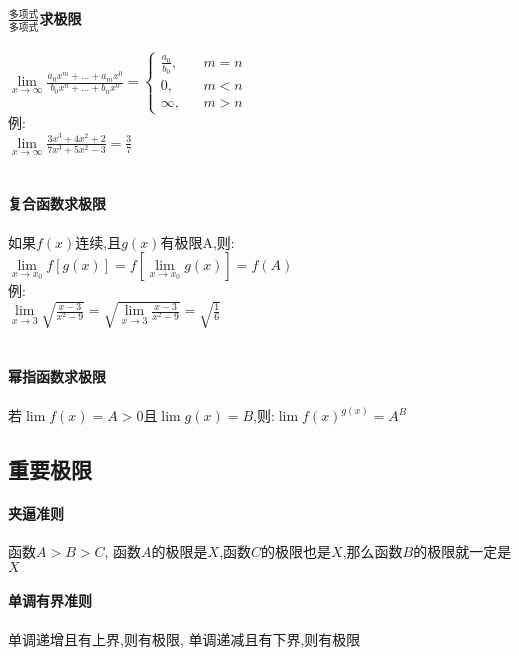 \documentclass{article}
\begin{document}
\begin{flushleft}
	\paragraph{$\frac{\mbox{多项式}}{\mbox{多项式}}$求极限}
	$\lim\limits_{x\to \infty} \frac{a_0x^m+...+a_mx^0}{b_0x^n+...+b_nx^0}=
	\left\{
	\begin{array}{rcl}
	\frac{a_0}{b_0}, & & {m=n}\\
	0, & & {m<n}\\
	\infty, & & {m>n}
	\end{array} \right.$\\
	例:\\
	$\lim\limits_{x\to \infty} \frac{3x^3+4x^2+2}{7x^3+5x^2-3} = \frac{3}{7}$\\
	~\\
	\paragraph{复合函数求极限}
	如果$f(x)$连续,且$g(x)$有极限A,则:\\
	$\lim\limits_{x\to x_0} f[g(x)]=f[\lim\limits_{x\to x_0}g(x)]=f(A)$\\
	例:\\
	$\lim\limits_{x\to 3} \sqrt{\frac{x-3}{x^2-9}}= \sqrt{\lim\limits_{x\to 3} \frac{x-3}{x^2-9}}=\sqrt{\frac{1}{6}}$\\
	~\\
	\paragraph{幂指函数求极限}
	若$\lim f(x)=A>0$且$\lim g(x)=B$,则:$\lim f(x)^{g(x)}=A^B$\\
	
	\subsection{重要极限}
	
	\paragraph{夹逼准则}
	函数$A>B>C$, 函数$A$的极限是$X$,函数$C$的极限也是$X$,那么函数$B$的极限就一定是$X$\\
	\paragraph{单调有界准则}
	单调递增且有上界,则有极限, 单调递减且有下界,则有极限\\
	~\\

\end{flushleft}
\end{document}
